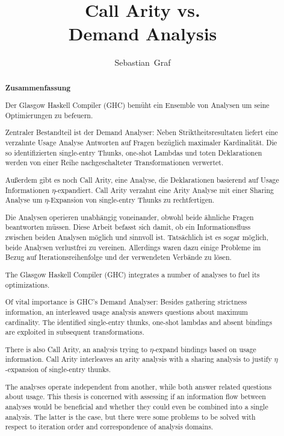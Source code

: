 \documentclass[12pt,a4paper,twoside,headings=openright]{scrreprt}
\title{Call Arity vs.\\Demand Analysis}
\author{Sebastian~Graf}
\begin{document}
\begin{otherlanguage}{ngerman} %
\mytitlepage
\end{otherlanguage}

\begin{abstract}
\begin{center}\Huge\textbf{\textsf{Zusammenfassung}}
\end{center}
\vfill

  Der Glasgow Haskell Compiler (GHC) bemüht ein Ensemble von Analysen um seine Optimierungen zu befeuern.

  Zentraler Bestandteil ist der Demand Analyser:
  Neben Striktheitsresultaten liefert eine verzahnte Usage Analyse Antworten auf Fragen bezüglich maximaler Kardinalität.
  Die so identifizierten single-entry Thunks, one-shot Lambdas und toten Deklarationen werden von einer Reihe nachgeschalteter Transformationen verwertet.

  Außerdem gibt es noch Call Arity, eine Analyse, die Deklarationen basierend auf Usage Informationen $\eta$-expandiert.
  Call Arity verzahnt eine Arity Analyse mit einer Sharing Analyse um $\eta$-Expansion von single-entry Thunks zu rechtfertigen.

  Die Analysen operieren unabhängig voneinander, obwohl beide ähnliche Fragen beantworten müssen.
  Diese Arbeit befasst sich damit, ob ein Informationsfluss zwischen beiden Analysen möglich und sinnvoll ist.
  Tatsächlich ist es sogar möglich, beide Analysen verlustfrei zu vereinen. 
  Allerdings waren dazu einige Probleme im Bezug auf Iterationsreihenfolge und der verwendeten Verbände zu lösen.

\vfill

  The Glasgow Haskell Compiler (GHC) integrates a number of analyses to fuel its optimizations.

  Of vital importance is GHC's Demand Analyser: Besides gathering strictness information, an interleaved usage analysis answers questions about maximum cardinality.
  The identified single-entry thunks, one-shot lambdas and absent bindings are exploited in subsequent transformations.

  There is also Call Arity, an analysis trying to $\eta$-expand bindings based on usage information. 
  Call Arity interleaves an arity analysis with a sharing analysis to justify $\eta$-expansion of single-entry thunks.

  The analyses operate independent from another, while both answer related questions about usage. 
  This thesis is concerned with assessing if an information flow between analyses would be beneficial and whether they could even be combined into a single analysis. 
  The latter is the case, but there were some problems to be solved with respect to iteration order and correspondence of analysis domains.

\vfill

\end{abstract}
\end{document}
